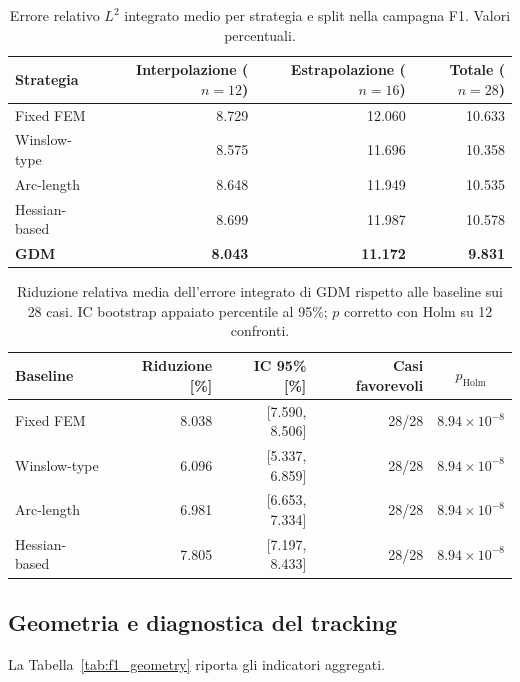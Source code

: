 \begin{table}[!t]
\centering\small
\caption{Errore relativo $L^2$ integrato medio per strategia e split nella campagna F1. Valori percentuali.}
\label{tab:f1_errors}
\begin{tabular*}{\textwidth}{@{\extracolsep{\fill}}lrrr}
\toprule
Strategia & Interpolazione ($n=12$) & Estrapolazione ($n=16$) & Totale ($n=28$)\\
\midrule
Fixed FEM & 8.729 & 12.060 & 10.633\\
Winslow-type & 8.575 & 11.696 & 10.358\\
Arc-length & 8.648 & 11.949 & 10.535\\
Hessian-based & 8.699 & 11.987 & 10.578\\
\textbf{GDM} & \textbf{8.043} & \textbf{11.172} & \textbf{9.831}\\
\bottomrule
\end{tabular*}
\end{table}

\begin{table}[!t]
\centering\small
\caption{Riduzione relativa media dell'errore integrato di GDM rispetto alle baseline sui 28 casi. IC bootstrap appaiato percentile al 95\%; $p$ corretto con Holm su 12 confronti.}
\label{tab:f1_paired}
\begin{tabular*}{\textwidth}{@{\extracolsep{\fill}}lrrrc}
\toprule
Baseline & Riduzione [\%] & IC 95\% [\%] & Casi favorevoli & $p_{\mathrm{Holm}}$\\
\midrule
Fixed FEM & 8.038 & [7.590, 8.506] & 28/28 & $8.94\times10^{-8}$\\
Winslow-type & 6.096 & [5.337, 6.859] & 28/28 & $8.94\times10^{-8}$\\
Arc-length & 6.981 & [6.653, 7.334] & 28/28 & $8.94\times10^{-8}$\\
Hessian-based & 7.805 & [7.197, 8.433] & 28/28 & $8.94\times10^{-8}$\\
\bottomrule
\end{tabular*}
\end{table}

\subsection{Geometria e diagnostica del tracking}

La Tabella~\ref{tab:f1_geometry} riporta gli indicatori aggregati.

